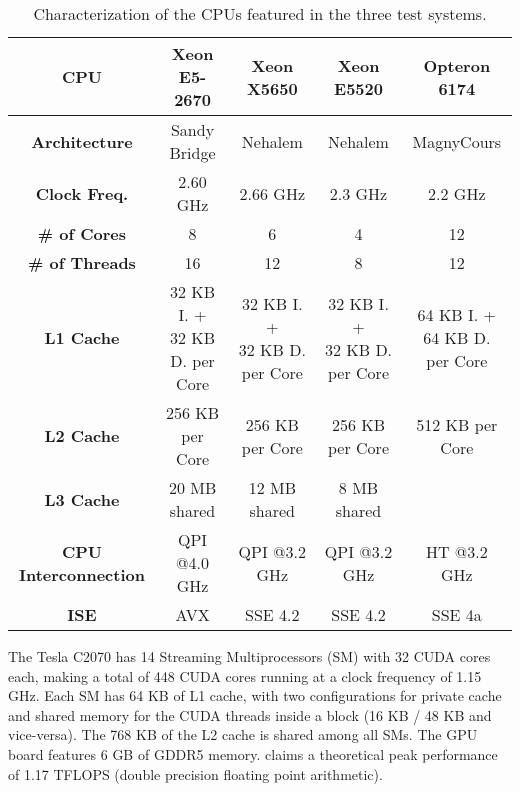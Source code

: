 \begin{footnotesize}
\begin{table}[!htp]
	\begin{center}
	\smaller
		\begin{tabular}{|c|c|c|c|c|}
			\hline
			\textbf{CPU} & \intel Xeon E5-2670 & \intel Xeon X5650 & \intel Xeon E5520 & \amd Opteron 6174 \\ \hline
			\textbf{Architecture} & Sandy Bridge & Nehalem & Nehalem & Magny\-Cours \\ \hline
			\textbf{Clock Freq.} & 2.60 GHz & 2.66 GHz & 2.3 GHz & 2.2 GHz \\ \hline
			\textbf{\# of Cores} & 8 & 6 & 4 & 12 \\ \hline
			\textbf{\# of Threads} & 16 & 12 & 8 & 12 \\ \hline
			\textbf{L1 Cache} & \specialcell{32 KB I. +\\32 KB D. per Core} & \specialcell{32 KB I. +\\32 KB D. per Core} & \specialcell{32 KB I. +\\32 KB D. per Core} & \specialcell{64 KB I. +\\64 KB D. per Core} \\ \hline
			\textbf{L2 Cache} & 256 KB per Core & 256 KB per Core & 256 KB per Core & 512 KB per Core \\ \hline
			\textbf{L3 Cache} & 20 MB shared & 12 MB shared & 8 MB shared & \- \\ \hline
			\textbf{CPU Interconnection} & QPI @4.0 GHz & QPI @3.2 GHz & QPI @3.2 GHz & HT @3.2 GHz \\ \hline
			\textbf{ISE} & AVX & SSE 4.2 & SSE 4.2 & SSE 4a \\
			\hline
		\end{tabular}
		\caption{Characterization of the CPUs featured in the three test systems.}
		\label{tab:CPUS}
	\end{center}
\end{table}
\end{footnotesize}

The \nvidia Tesla C2070 has 14 Streaming Multiprocessors (SM) with 32 CUDA cores each, making a total of 448 CUDA cores running at a clock frequency of 1.15 GHz. Each SM has 64 KB of L1 cache, with two configurations for private cache and shared memory for the CUDA threads inside a block (16 KB / 48 KB and vice-versa). The 768 KB of the L2 cache is shared among all SMs. The GPU board features 6 GB of GDDR5 memory. \nvidia claims a theoretical peak performance of 1.17 TFLOPS (double precision floating point arithmetic).

